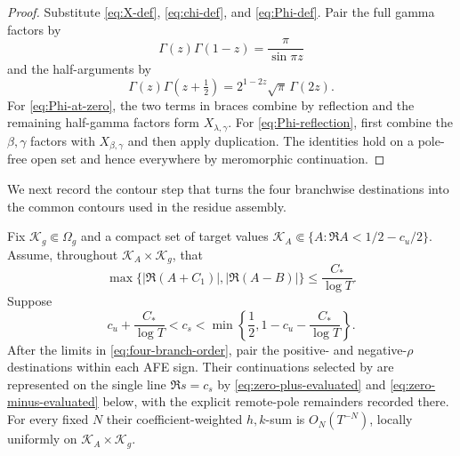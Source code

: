 \begin{proof}
Substitute \eqref{eq:X-def}, \eqref{eq:chi-def}, and
\eqref{eq:Phi-def}.  Pair the full gamma factors by
\[
                  \Gamma(z)\Gamma(1-z)=\frac{\pi}{\sin\pi z}
\]
and the half-arguments by
\[
 \Gamma(z)\Gamma(z+\tfrac12)=2^{1-2z}\sqrt\pi\,\Gamma(2z).
\]
For \eqref{eq:Phi-at-zero}, the two terms in braces combine by reflection
and the remaining half-gamma factors form $X_{\lambda,\gamma}$.  For
\eqref{eq:Phi-reflection}, first combine the $\beta,\gamma$ factors with
$X_{\beta,\gamma}$ and then apply duplication.  The identities hold on a
pole-free open set and hence everywhere by meromorphic continuation.
\end{proof}

We next record the contour step that turns the four branchwise destinations
into the common contours used in the residue assembly.

\begin{lemma}\label{lem:common-contour-recovery}
Fix $\mathscr K_g\Subset\Omega_g$ and a compact set of target values
$\mathscr K_A\Subset\{A:\Re A<1/2-c_u/2\}$.  Assume, throughout
$\mathscr K_A\times\mathscr K_g$, that
\begin{equation}\label{eq:common-contour-shift-bound}
 \max\{|\Re(A+C_1)|,|\Re(A-B)|\}\leq \frac{C_*}{\log T}.
\end{equation}
Suppose
\begin{equation}\label{eq:common-contour-window}
 c_u+\frac{C_*}{\log T}<c_s<
 \min\left\{\frac12,
 1-c_u-\frac{C_*}{\log T}\right\}.
\end{equation}
After the limits in \eqref{eq:four-branch-order}, pair the positive- and
negative-$\rho$ destinations within each AFE sign.  Their continuations
selected by  are represented on the
single line $\Re s=c_s$ by \eqref{eq:zero-plus-evaluated} and
\eqref{eq:zero-minus-evaluated} below, with the explicit remote-pole
remainders recorded there.  For every fixed $N$ their coefficient-weighted
$h,k$-sum is $O_N(T^{-N})$, locally uniformly on
$\mathscr K_A\times\mathscr K_g$.
\end{lemma}

